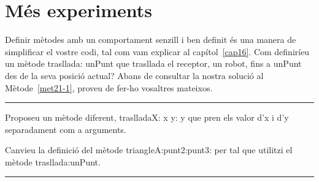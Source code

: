 \section{Més experiments}

\begin{center}
\colorbox{black}{}
\end{center}
{\small
\noindent
Definir mètodes amb un comportament senzill i ben definit és una manera de simplificar el vostre codi, tal com vam explicar al capítol~\ref{cap16}. Com definiríeu un mètode \textsf{trasllada: unPunt} que trasllada el receptor, un robot, fins a \textsf{unPunt} des de la seva posició actual? Abans de consultar la nostra solució al Mètode~\ref{met21-1}, proveu de fer-ho vosaltres mateixos.}\\
\noindent
\rule{\textwidth}{3pt}


Proposeu un mètode diferent, \textsf{traslladaX: x y: y} que pren els valor d'\textsf{x} i d'\textsf{y} separadament com a arguments. 

\begin{center}
\colorbox{black}{}
\end{center}
{\small
\noindent
Canvieu la definició del mètode \textsf{triangleA:punt2:punt3:} per tal que utilitzi el mètode \textsf{trasllada:unPunt}.}\\
\noindent
\rule{\textwidth}{3pt}

